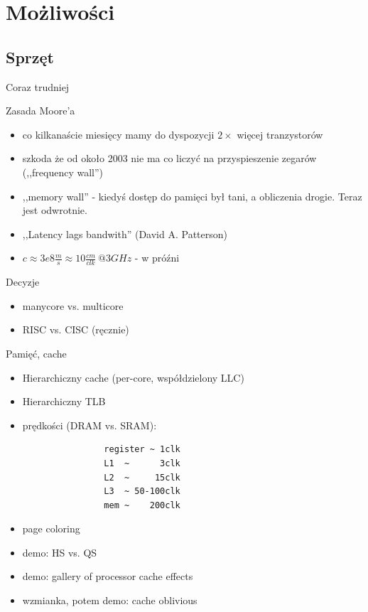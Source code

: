 \section{Możliwości} %
\subsection{Sprzęt}
\begin{frame}{Coraz trudniej}
	\begin{block}{Zasada Moore'a}
		\begin{itemize}
			\item co kilkanaście miesięcy mamy do dyspozycji $2\times$ więcej tranzystorów
			\item szkoda że od około 2003 nie ma co liczyć na przyspieszenie zegarów (,,frequency wall'')
			\item ,,memory wall'' - kiedyś dostęp do pamięci był tani, a obliczenia drogie. Teraz jest odwrotnie.
			\item ,,Latency lags bandwith'' (David A. Patterson)
			\item $c \approx 3e8\frac{m}{s} \approx 10 \frac{cm}{clk}~@3GHz$ - w próźni
		\end{itemize}
	\end{block}
	\begin{block}{Decyzje}
		\begin{itemize}
			\item manycore vs. multicore
			\item RISC vs. CISC (ręcznie)
		\end{itemize}
	\end{block}
	\begin{block}{Pamięć, cache}
		\begin{itemize}
			\item Hierarchiczny cache (per-core, współdzielony LLC)
			\item Hierarchiczny TLB
			\item prędkości (DRAM vs. SRAM):
			\begin{verbatim}
				register ~ 1clk
				L1  ~      3clk
				L2  ~     15clk
				L3  ~ 50-100clk
				mem ~    200clk
			\end{verbatim}
			\item page coloring
			\item demo: HS vs. QS
			\item demo: gallery of processor cache effects
			\item wzmianka, potem demo: cache oblivious

\end{itemize}
\end{block}
\end{frame}
